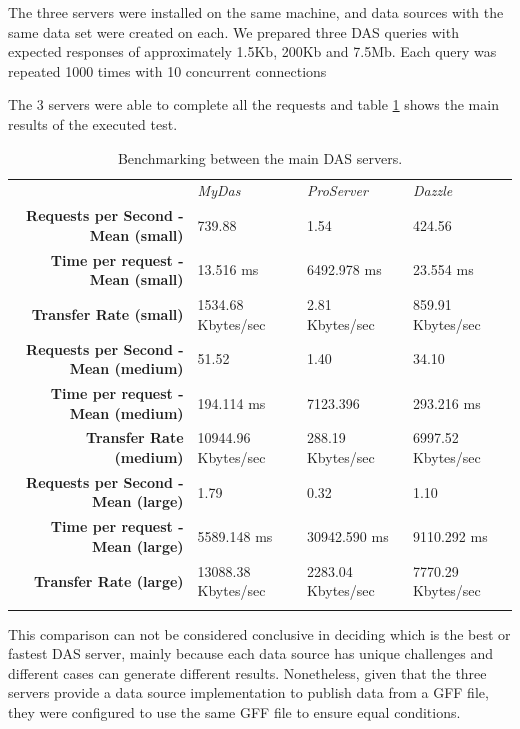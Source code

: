The three servers were installed on the same machine, and data sources with the same data set were created on each. We prepared three DAS queries with expected responses of approximately 1.5Kb, 200Kb and 7.5Mb. Each query was repeated 1000 times with 10 concurrent connections

The 3 servers were able to complete all the requests and table \ref{tab:table2} shows the main results of the executed test.

\begin{table}[!ht]
        \caption{Benchmarking between the main DAS servers.}
        \begin{tabular}{ r | l | l | l }
 \rowcolor{table_header}
 & \emph{MyDas} & \emph{ProServer} & \emph{Dazzle}\\
 \rowcolor{row_odd}
\textbf{Requests per Second - Mean (small)} & 739.88 & 1.54 & 424.56\\
 \rowcolor{row_even}
\textbf{Time per request - Mean (small)} & 13.516 ms & 6492.978 ms & 23.554 ms\\
 \rowcolor{row_odd}
\textbf{Transfer Rate (small)} & 1534.68 Kbytes/sec & 2.81 Kbytes/sec & 859.91 Kbytes/sec\\
 \rowcolor{row_even}
\textbf{Requests per Second - Mean (medium)} & 51.52 & 1.40 & 34.10\\
 \rowcolor{row_odd}
\textbf{Time per request - Mean (medium)} & 194.114 ms & 7123.396 & 293.216 ms\\
 \rowcolor{row_even}
\textbf{Transfer Rate (medium)} & 10944.96 Kbytes/sec & 288.19 Kbytes/sec & 6997.52 Kbytes/sec\\
 \rowcolor{row_odd}
\textbf{Requests per Second - Mean (large)} & 1.79 & 0.32 & 1.10\\
 \rowcolor{row_even}
\textbf{Time per request - Mean (large)} & 5589.148 ms & 30942.590 ms & 9110.292 ms\\
 \rowcolor{row_odd}
\textbf{Transfer Rate (large)} & 13088.38 Kbytes/sec & 2283.04 Kbytes/sec & 7770.29 Kbytes/sec\\
 \rowcolor{row_even}
        \end{tabular}
        \label{tab:table2}
\end{table}

This comparison can not be considered conclusive in deciding which is the best or fastest DAS server, mainly because each data source has unique challenges and different cases can generate different results. Nonetheless, given that the three servers provide a data source implementation to publish data from a GFF file, they were configured to use the same GFF file to ensure equal conditions. 

